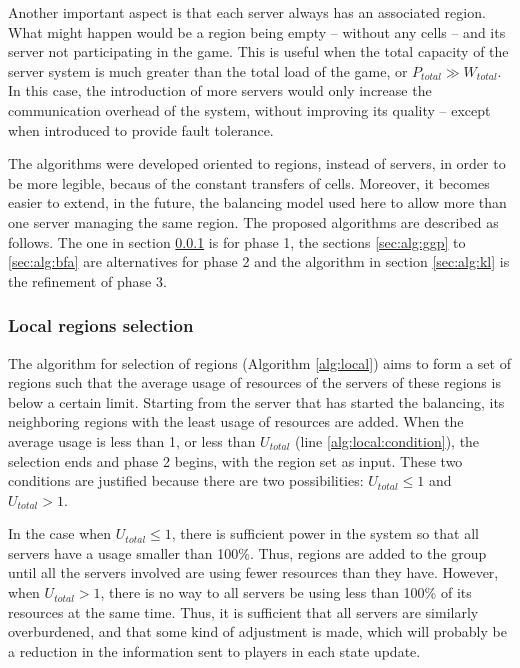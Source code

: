 Another important aspect is that each server always has an associated region. What might happen would be a region being empty -- without any cells -- and its server not participating in the game. This is useful when the total capacity of the server system is much greater than the total load of the game, or $ P_{total} \gg W_{total}$. In this case, the introduction of more servers would only increase the communication overhead of the system, without improving its quality -- except when introduced to provide fault tolerance.

The algorithms were developed oriented to regions, instead of servers, in order to be more legible, becaus of the constant transfers of cells. Moreover, it becomes easier to extend, in the future, the balancing model used here to allow more than one server managing the same region. The proposed algorithms are described as follows. The one in section \ref{sec:alg:localselect} is for phase 1, the sections \ref{sec:alg:ggp} to \ref{sec:alg:bfa} are alternatives for phase 2 and the algorithm in section \ref{sec:alg:kl} is the refinement of phase 3.

\subsubsection{Local regions selection}
\label{sec:alg:localselect}

The algorithm for selection of regions (Algorithm \ref{alg:local}) aims to form a set of regions such that the average usage of resources of the servers of these regions is below a certain limit. Starting from the server that has started the balancing, its neighboring regions with the least usage of resources are added. When the average usage is less than 1, or less than $ U_{total}$ (line \ref{alg:local:condition}), the selection ends and phase 2 begins, with the region set as input. These two conditions are justified because there are two possibilities: $U_{total} \leq 1$ and $U_{total} > 1$.
	
In the case when $U_{total} \leq 1$, there is sufficient power in the system so that all servers have a usage smaller than 100\%. Thus, regions are added to the group until all the servers involved are using fewer resources than they have. However, when $U_{total} > 1$, there is no way to all servers be using less than 100\% of its resources at the same time. Thus, it is sufficient that all servers are similarly overburdened, and that some kind of adjustment is made, which will probably be a reduction in the information sent to players in each state update.


